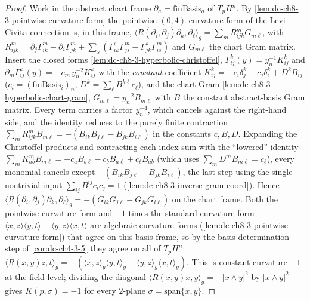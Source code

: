 \begin{proof}
  \leanok
\sketch
  Work in the abstract chart frame $\partial_a=\text{finBasis}_a$ of $T_pH^n$. By
  \cref{lem:dc-ch8-3-pointwise-curvature-form} the pointwise $(0,4)$ curvature form
  of the Levi-Civita connection is, in this frame,
  $\langle R(\partial_i,\partial_j)\partial_k,\partial_\ell\rangle_g=\sum_m
  R^m_{ijk}G_{m\ell}$, with $R^m_{ijk}=\partial_j\Gamma^m_{ik}-\partial_i\Gamma^m_{jk}
  +\sum_s(\Gamma^s_{ik}\Gamma^m_{js}-\Gamma^s_{jk}\Gamma^m_{is})$ and $G_{m\ell}$
  the chart Gram matrix. Insert the closed forms
  \cref{lem:dc-ch8-3-hyperbolic-christoffel}, $\Gamma^k_{ij}(y)=y_n^{-1}K^k_{ij}$
  and $\partial_m\Gamma^k_{ij}(y)=-c_m\,y_n^{-2}K^k_{ij}$ with the \emph{constant}
  coefficient $K^k_{ij}=-c_i\delta^k_j-c_j\delta^k_i+D^kB_{ij}$
  ($c_i=(\text{finBasis}_i)_n$, $D^k=\sum_\ell B^{k\ell}c_\ell$), and the chart Gram
  \cref{lem:dc-ch8-3-hyperbolic-chart-gram}, $G_{m\ell}=y_n^{-2}B_{m\ell}$ with $B$
  the constant abstract-basis Gram matrix. Every term carries a factor $y_n^{-4}$,
  which cancels against the right-hand side, and the identity reduces to the purely
  finite contraction $\sum_m R^m_{ijk}B_{m\ell}=-(B_{ik}B_{j\ell}-B_{jk}B_{i\ell})$
  in the constants $c,B,D$. Expanding the Christoffel products and contracting each
  index sum with the ``lowered'' identity $\sum_m K^m_{ab}B_{m\ell}=-c_aB_{b\ell}
  -c_bB_{a\ell}+c_\ell B_{ab}$ (which uses $\sum_m D^mB_{m\ell}=c_\ell$), every
  monomial cancels except $-(B_{ik}B_{j\ell}-B_{jk}B_{i\ell})$, the last step using
  the single nontrivial input $\sum_{ij}B^{ij}c_ic_j=1$
  (\cref{lem:dc-ch8-3-inverse-gram-coord}). Hence
  $\langle R(\partial_i,\partial_j)\partial_k,\partial_\ell\rangle_g
  =-(G_{ik}G_{j\ell}-G_{jk}G_{i\ell})$ on the chart frame. Both the pointwise
  curvature form and $-1$ times the standard curvature form
  $\langle x,z\rangle\langle y,t\rangle-\langle y,z\rangle\langle x,t\rangle$ are
  algebraic curvature forms (\cref{lem:dc-ch8-3-pointwise-curvature-form}) that
  agree on this basis frame, so by the basis-determination step of
  \cref{cor:dc-ch4-3-5} they agree on all of $T_pH^n$:
  $\langle R(x,y)z,t\rangle_g=-(\langle x,z\rangle_g\langle y,t\rangle_g
  -\langle y,z\rangle_g\langle x,t\rangle_g)$. This is constant curvature $-1$ at the
  field level; dividing the diagonal $\langle R(x,y)x,y\rangle_g=-|x\wedge y|^2$ by
  $|x\wedge y|^2$ gives $K(p,\sigma)=-1$ for every $2$-plane
  $\sigma=\mathrm{span}\{x,y\}$.
\end{proof}

